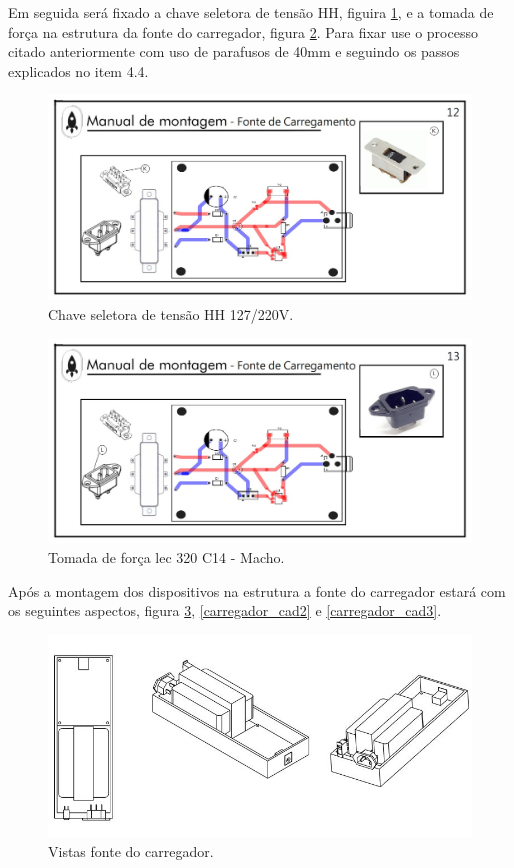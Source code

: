 Em seguida será fixado a chave seletora de tensão HH, figuira \ref{carregador12}, e a tomada de força na estrutura da fonte do carregador, figura \ref{carregador13}. Para fixar use o processo citado anteriormente com uso de parafusos de 40mm e seguindo os passos explicados no item 4.4.

\begin{figure}[H]
  \centering
  \includegraphics[width=\textwidth]{Figuras/Carregador/carregador_manual_12.jpg}
  \caption{Chave seletora de tensão HH 127/220V.} 
   \label{carregador12}
\end{figure}

\begin{figure}[H]
  \centering
  \includegraphics[width=\textwidth]{Figuras/Carregador/carregador_manual_13.jpg}
  \caption{Tomada de força lec 320 C14 - Macho.} 
   \label{carregador13}
\end{figure}

Após a montagem dos dispositivos na estrutura a fonte do carregador estará com os seguintes aspectos, figura \ref{carregador_cad1}, \ref{carregador_cad2} e \ref{carregador_cad3}.

\begin{figure}[H]
  \centering
  \includegraphics[width=\textwidth]{Figuras/Carregador/Carregador_cad1.JPG}
  \caption{Vistas fonte do carregador.} 
  \label{carregador_cad1}
\end{figure}

